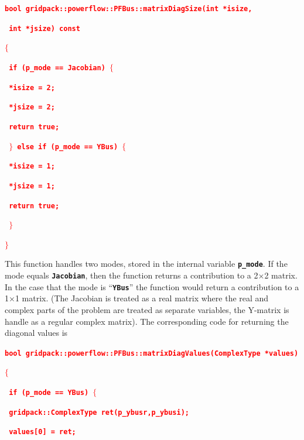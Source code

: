 \documentclass[12pt]{report} %
\begin{document}
\textcolor{red}{\texttt{\textbf{bool gridpack::powerflow::PFBus::matrixDiagSize(int *isize,}}}

\textcolor{red}{\texttt{\textbf{     int *jsize) const}}}

\textcolor{red}{\texttt{\textbf{$\boldsymbol{\mathrm{\{}}$}}}

\textcolor{red}{\texttt{\textbf{  if (p\_mode == Jacobian) $\boldsymbol{\mathrm{\{}}$}}}

\textcolor{red}{\texttt{\textbf{    *isize = 2;}}}

\textcolor{red}{\texttt{\textbf{    *jsize = 2;}}}

\textcolor{red}{\texttt{\textbf{    return true;}}}

\textcolor{red}{\texttt{\textbf{  $\boldsymbol{\mathrm{\}}}$ else if (p\_mode == YBus) $\boldsymbol{\mathrm{\{}}$}}}

\textcolor{red}{\texttt{\textbf{    *isize = 1;}}}

\textcolor{red}{\texttt{\textbf{    *jsize = 1;}}}

\textcolor{red}{\texttt{\textbf{    return true;}}}

\textcolor{red}{\texttt{\textbf{  $\boldsymbol{\mathrm{\}}}$}}}

\textcolor{red}{\texttt{\textbf{$\boldsymbol{\mathrm{\}}}$}}}

This function handles two modes, stored in the internal variable \texttt{\textbf{p\_mode}}. If the mode equals \texttt{\textbf{Jacobian}}, then the function returns a contribution to a 2$\mathrm{\times}$2 matrix. In the case that the mode is ``\texttt{\textbf{YBus}}'' the function would return a contribution to a 1$\mathrm{\times}$1 matrix. (The Jacobian is treated as a real matrix where the real and complex parts of the problem are treated as separate variables, the Y-matrix is handle as a regular complex matrix). The corresponding code for returning the diagonal values is

\textcolor{red}{\texttt{\textbf{bool gridpack::powerflow::PFBus::matrixDiagValues(ComplexType *values)}}}

\textcolor{red}{\texttt{\textbf{$\boldsymbol{\mathrm{\{}}$}}}

\textcolor{red}{\texttt{\textbf{  if (p\_mode == YBus) $\boldsymbol{\mathrm{\{}}$}}}

\textcolor{red}{\texttt{\textbf{    gridpack::ComplexType ret(p\_ybusr,p\_ybusi);}}}

\textcolor{red}{\texttt{\textbf{    values[0] = ret;}}}
\end{document}
